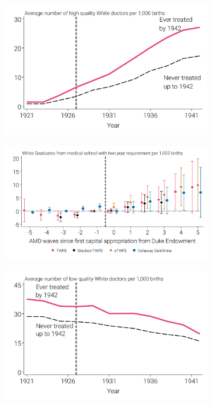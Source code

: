\documentclass[12pt]{article}
\begin{document}
\begin{figure}
\begin{minipage}{\linewidth}
\begin{subfigure}[b]{0.49\columnwidth}
    \includegraphics[width=.9\linewidth]{../analysis/output/appendix/figure_c2a2_white_rMD_good_by_treatment_status.pdf}
  \end{subfigure}    
  \begin{subfigure}[b]{0.49\columnwidth}
    \includegraphics[width=\linewidth]{../analysis/output/appendix/figure_c2b2_good_white_doctors_first_stage.pdf}
  \end{subfigure}  
  \begin{subfigure}[b]{0.49\columnwidth}
    \includegraphics[width=.9\linewidth]{../analysis/output/appendix/figure_c2a3_white_rMD_bad_by_treatment_status.pdf}

\end{subfigure}
\end{minipage}
\end{figure}
\end{document}
